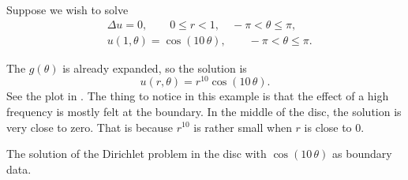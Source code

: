 \begin{example}
Suppose we wish to solve
\begin{align*}
& \Delta u = 0 , \qquad 0 \leq r < 1, \quad -\pi < \theta \leq \pi,\\
& u(1,\theta) = \cos(10\,\theta), \qquad -\pi < \theta \leq \pi.
\end{align*}

The $g(\theta)$ is already expanded, so
the solution is
\begin{equation*}
u(r,\theta) = r^{10} \cos(10\,\theta) .
\end{equation*}
See the plot in .
The thing to notice in this example is that the effect of a high frequency
is mostly felt at the boundary.  In the middle of the disc, the solution
is very close to zero.  That is because $r^{10}$ is rather small when $r$
is close to 0.
\begin{myfig}
\capstart
{}
\caption{The solution of the Dirichlet problem in the disc with
$\cos(10\,\theta)$ as boundary data.\label{dirichdisc:tenspeedfig}}
\end{myfig}
\end{example}

